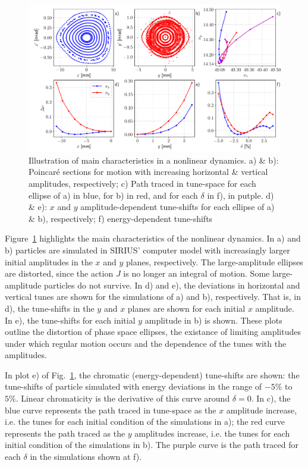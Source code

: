 \begin{figure}
    \centering
    \includegraphics[width=\textwidth]{Images/nonlinear_dynamics_phase_tunes.pdf}
    \caption[Illustration of main characteristics in a nonlinear dynamics]{Illustration of main characteristics in a nonlinear dynamics. a) \& b): Poincaré sections for motion with increasing horizontal \& vertical amplitudes, respectively; c) Path traced in tune-space for each ellipse of a) in blue, for b) in red, and for each $\delta$ in f), in putple. d) \& e): $x$ and $y$ amplitude-dependent tune-shifts for each ellipse of a) \& b), respectively; f) energy-dependent tune-shifts}
    \label{fig:tune_shifts}
\end{figure}

Figure~\ref{fig:tune_shifts} highlights the main characteristics of the nonlinear dynamics. In a) and b) particles are simulated in SIRIUS' computer model with increasingly larger initial amplitudes in the $x$ and $y$ planes, respectively. The large-amplitude ellipses are distorted, since the action $J$ is no longer an integral of motion. Some large-amplitude particles do not survive. In d) and e), the deviations in horizontal and vertical tunes are shown for the simulations of a) and b), respectively. That is, in d), the tune-shifts in the $y$ and $x$ planes are shown for each initial $x$ amplitude. In e), the tune-shifts for each initial $y$ amplitude in b) is shown. These plots outline the distortion of phase space ellipses, the existance of limiting amplitudes under which regular motion occurs and the dependence of the tunes with the amplitudes.

In plot e) of Fig.~\ref{fig:tune_shifts}, the chromatic (energy-dependent) tune-shifts are shown: the tune-shifts of particle simulated with energy deviations in the range of $-5\%$ to $5\%$. Linear chromaticity is the derivative of this curve around $\delta=0$. In c), the blue curve represents the path traced in tune-space as the $x$ amplitude increase, i.e. the tunes for each initial condition of the simulations in a); the red curve represents the path traced as the $y$ amplitudes increase,  i.e. the tunes for each initial condition of the simulations in b). The purple curve is the path traced for each $\delta$ in the simulations shown at f).
